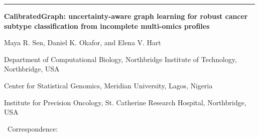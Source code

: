 \documentclass[11pt,a4paper]{article}
\begin{document}

\thispagestyle{empty}

\noindent
\begin{minipage}[t]{0.70\textwidth}
  {\sffamily\LARGE\bfseries\color{BMCBlue}\journalname}
\end{minipage}%
\begin{minipage}[t]{0.30\textwidth}
  \raggedleft{\sffamily\bfseries\color{BMCGreen}\articletype}
\end{minipage}

\vspace{0.45em}
{\color{BMCBlue}\rule{\textwidth}{1.2pt}}
\vspace{1.4em}

{\sffamily\fontsize{21}{25}\selectfont\bfseries\color{BMCDark}
CalibratedGraph: uncertainty-aware graph learning for robust cancer subtype
classification from incomplete multi-omics profiles\par}

\vspace{1.2em}
{\large
Maya R. Sen\corresponding,
Daniel K. Okafor, and
Elena V. Hart\par}

\vspace{0.8em}
{\small
{}Department of Computational Biology, Northbridge Institute of Technology,
Northbridge, USA\par
{}Center for Statistical Genomics, Meridian University, Lagos, Nigeria\par
{}Institute for Precision Oncology, St. Catherine Research Hospital,
Northbridge, USA\par}

\vspace{0.7em}
{\small
\corresponding\ Correspondence: \par
{}\par}

\vspace{1em}
\begin{center}
\end{center}

\vspace{0.8em}









\end{document}

